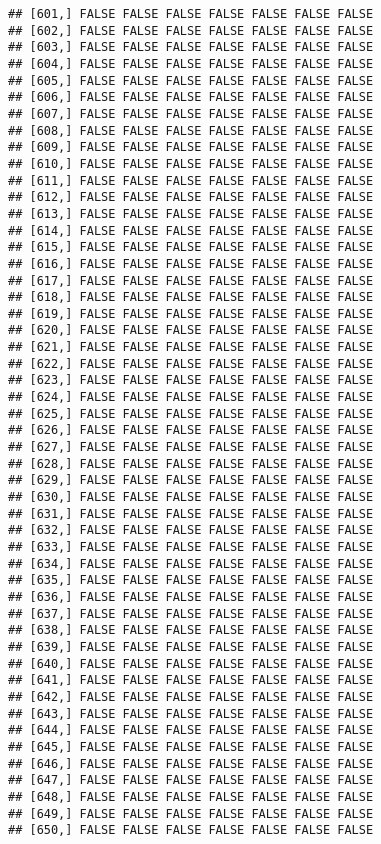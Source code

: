 \documentclass[
]{article}
\begin{document}
\begin{verbatim}
## [601,] FALSE FALSE FALSE FALSE FALSE FALSE FALSE
## [602,] FALSE FALSE FALSE FALSE FALSE FALSE FALSE
## [603,] FALSE FALSE FALSE FALSE FALSE FALSE FALSE
## [604,] FALSE FALSE FALSE FALSE FALSE FALSE FALSE
## [605,] FALSE FALSE FALSE FALSE FALSE FALSE FALSE
## [606,] FALSE FALSE FALSE FALSE FALSE FALSE FALSE
## [607,] FALSE FALSE FALSE FALSE FALSE FALSE FALSE
## [608,] FALSE FALSE FALSE FALSE FALSE FALSE FALSE
## [609,] FALSE FALSE FALSE FALSE FALSE FALSE FALSE
## [610,] FALSE FALSE FALSE FALSE FALSE FALSE FALSE
## [611,] FALSE FALSE FALSE FALSE FALSE FALSE FALSE
## [612,] FALSE FALSE FALSE FALSE FALSE FALSE FALSE
## [613,] FALSE FALSE FALSE FALSE FALSE FALSE FALSE
## [614,] FALSE FALSE FALSE FALSE FALSE FALSE FALSE
## [615,] FALSE FALSE FALSE FALSE FALSE FALSE FALSE
## [616,] FALSE FALSE FALSE FALSE FALSE FALSE FALSE
## [617,] FALSE FALSE FALSE FALSE FALSE FALSE FALSE
## [618,] FALSE FALSE FALSE FALSE FALSE FALSE FALSE
## [619,] FALSE FALSE FALSE FALSE FALSE FALSE FALSE
## [620,] FALSE FALSE FALSE FALSE FALSE FALSE FALSE
## [621,] FALSE FALSE FALSE FALSE FALSE FALSE FALSE
## [622,] FALSE FALSE FALSE FALSE FALSE FALSE FALSE
## [623,] FALSE FALSE FALSE FALSE FALSE FALSE FALSE
## [624,] FALSE FALSE FALSE FALSE FALSE FALSE FALSE
## [625,] FALSE FALSE FALSE FALSE FALSE FALSE FALSE
## [626,] FALSE FALSE FALSE FALSE FALSE FALSE FALSE
## [627,] FALSE FALSE FALSE FALSE FALSE FALSE FALSE
## [628,] FALSE FALSE FALSE FALSE FALSE FALSE FALSE
## [629,] FALSE FALSE FALSE FALSE FALSE FALSE FALSE
## [630,] FALSE FALSE FALSE FALSE FALSE FALSE FALSE
## [631,] FALSE FALSE FALSE FALSE FALSE FALSE FALSE
## [632,] FALSE FALSE FALSE FALSE FALSE FALSE FALSE
## [633,] FALSE FALSE FALSE FALSE FALSE FALSE FALSE
## [634,] FALSE FALSE FALSE FALSE FALSE FALSE FALSE
## [635,] FALSE FALSE FALSE FALSE FALSE FALSE FALSE
## [636,] FALSE FALSE FALSE FALSE FALSE FALSE FALSE
## [637,] FALSE FALSE FALSE FALSE FALSE FALSE FALSE
## [638,] FALSE FALSE FALSE FALSE FALSE FALSE FALSE
## [639,] FALSE FALSE FALSE FALSE FALSE FALSE FALSE
## [640,] FALSE FALSE FALSE FALSE FALSE FALSE FALSE
## [641,] FALSE FALSE FALSE FALSE FALSE FALSE FALSE
## [642,] FALSE FALSE FALSE FALSE FALSE FALSE FALSE
## [643,] FALSE FALSE FALSE FALSE FALSE FALSE FALSE
## [644,] FALSE FALSE FALSE FALSE FALSE FALSE FALSE
## [645,] FALSE FALSE FALSE FALSE FALSE FALSE FALSE
## [646,] FALSE FALSE FALSE FALSE FALSE FALSE FALSE
## [647,] FALSE FALSE FALSE FALSE FALSE FALSE FALSE
## [648,] FALSE FALSE FALSE FALSE FALSE FALSE FALSE
## [649,] FALSE FALSE FALSE FALSE FALSE FALSE FALSE
## [650,] FALSE FALSE FALSE FALSE FALSE FALSE FALSE

\end{verbatim}
\end{document}
